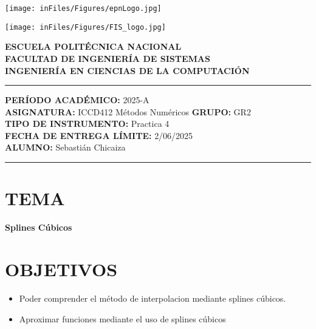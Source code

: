 \documentclass[12pt]{article}
\begin{document}
\begin{minipage}{0.45\textwidth}
    \texttt{[image: inFiles/Figures/epnLogo.jpg]}
\end{minipage}
\hfill
\begin{minipage}{0.45\textwidth}
    \raggedleft
    \texttt{[image: inFiles/Figures/FIS\_logo.jpg]}
\end{minipage}

\vspace{0.5cm}

\begin{center}
    \textbf{ESCUELA POLITÉCNICA NACIONAL}\\[0.2cm]
    \textbf{FACULTAD DE INGENIERÍA DE SISTEMAS}\\[0.2cm]
    \textbf{INGENIERÍA EN CIENCIAS DE LA COMPUTACIÓN}
\end{center}

\vspace{0.5cm}
\hrule
\vspace{0.5cm}

\noindent\textbf{PERÍODO ACADÉMICO:} 2025-A\\[0.2cm]
\noindent\textbf{ASIGNATURA:} ICCD412 Métodos Numéricos \hfill \textbf{GRUPO:} GR2\\[0.2cm]
\noindent\textbf{TIPO DE INSTRUMENTO:} Practica 4\\[0.2cm]
\noindent\textbf{FECHA DE ENTREGA LÍMITE:} {2/06/2025}\\[0.2cm]
\noindent\textbf{ALUMNO:} {Sebastián Chicaiza}

\vspace{0.5cm}
\hrule
\vspace{1cm}


\section*{TEMA}

\begin{center}
    \Large\textbf{Splines Cúbicos}
\end{center}
\vspace{0.5cm}

\section*{OBJETIVOS}
\begin{itemize}
    \item {Poder comprender el método de interpolacion mediante splines cúbicos.}
    \item {Aproximar funciones mediante el uso de splines cúbicos}
\end{itemize}
\vspace{0.5cm}
\end{document}
